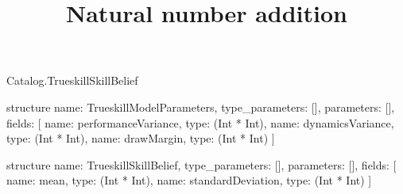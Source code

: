 \begin{lexlean}{Catalog.TrueskillSkillBelief}
\title{Natural number addition}
\begin{semanticmodule}
structure{
  name: TrueskillModelParameters,
  type_parameters: [],
  parameters: [],
  fields: [
    {name: performanceVariance, type: (Int * Int)},
    {name: dynamicsVariance, type: (Int * Int)},
    {name: drawMargin, type: (Int * Int)}
  ]
}

structure{
  name: TrueskillSkillBelief,
  type_parameters: [],
  parameters: [],
  fields: [
    {name: mean, type: (Int * Int)},
    {name: standardDeviation, type: (Int * Int)}
  ]
}
\end{semanticmodule}
\end{lexlean}

